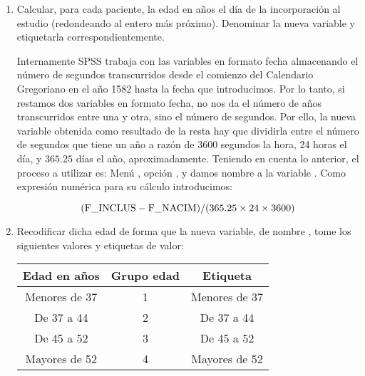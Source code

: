 \documentclass[a4paper]{article}
\begin{document}
\begin{enumerate}
\item Calcular, para cada paciente, la edad en años el día de la
incorporación al estudio (redondeando al entero más próximo).
Denominar la nueva variable  y etiquetarla
correspondientemente.

\begin{indicacion}{
Internamente SPSS trabaja con las variables en formato fecha
almacenando el número de segundos transcurridos desde el comienzo
del Calendario Gregoriano en el año 1582 hasta la fecha que
introducimos. Por lo tanto, si restamos dos variables en formato
fecha, no nos da el número de años transcurridos entre una y otra,
sino el número de segundos. Por ello, la nueva variable obtenida
como resultado de la resta hay que dividirla entre el número de
segundos que tiene un año a razón de 3600 segundos la hora, 24 horas
el día, y $365.25$ días el año, aproximadamente. Teniendo en cuenta
lo anterior, el proceso a utilizar es: Menú
, opción , y damos nombre a la variable . Como
expresión numérica para su cálculo introducimos:

\[
({\rm F\_INCLUS - F\_NACIM})/(365.25 \times 24 \times 3600)
\]

}
\end{indicacion}

\item Recodificar dicha edad de forma que la nueva variable, de
nombre , tome los siguientes valores y etiquetas
de valor:

\begin{center}

\begin{tabular}{|l|l|l|}
\hline
\multicolumn{1}{|c|}{Edad en años} & \multicolumn{1}{c|}{Grupo edad} & \multicolumn{1}{c|}{Etiqueta} \\
\hline
\multicolumn{1}{|c|}{Menores de 37} & \multicolumn{1}{c|}{1} & \multicolumn{1}{c|}{Menores de 37} \\
\hline
\multicolumn{1}{|c|}{De 37 a 44} & \multicolumn{1}{c|}{2} & \multicolumn{1}{c|}{De 37 a 44} \\
\hline
\multicolumn{1}{|c|}{De 45 a 52} & \multicolumn{1}{c|}{3} & \multicolumn{1}{c|}{De 45 a 52} \\
\hline
\multicolumn{1}{|c|}{Mayores de 52} & \multicolumn{1}{c|}{4} & \multicolumn{1}{c|}{Mayores de 52} \\
\hline
\end{tabular}


\end{center}
\end{enumerate}
\end{document}
